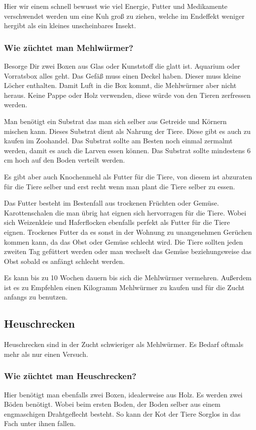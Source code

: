 Hier wir einem schnell bewusst wie viel Energie, Futter und Medikamente verschwendet werden um eine Kuh groß zu ziehen, welche im Endeffekt weniger hergibt als ein kleines unscheinbares Insekt.

\subsubsection{Wie züchtet man Mehlwürmer?}
Besorge Dir zwei Boxen aus Glas oder Kunststoff die glatt ist. Aquarium oder Vorratsbox alles geht. Das Gefäß muss einen Deckel haben. Dieser muss kleine Löcher enthalten. Damit Luft in die Box kommt, die Mehlwürmer aber nicht heraus. Keine Pappe oder Holz verwenden, diese würde von den Tieren zerfressen werden.

Man benötigt ein Substrat das man sich selber aus Getreide und Körnern mischen kann. Dieses Substrat dient als Nahrung der Tiere. Diese gibt es auch zu kaufen im Zoohandel. Das Substrat sollte am Besten noch einmal zermalmt werden, damit es auch die Larven essen können. Das Substrat sollte mindestens 6 cm hoch auf den Boden verteilt werden. 

Es gibt aber auch Knochenmehl als Futter für die Tiere, von diesem ist abzuraten für die Tiere selber und erst recht wenn man plant die Tiere selber zu essen. 
 
Das Futter besteht im Bestenfall aus trockenen Früchten oder Gemüse. Karottenschalen die man übrig hat eignen sich hervorragen für die Tiere. Wobei sich Weizenkleie und Haferflocken ebenfalls perfekt als Futter für die Tiere eignen. 
Trockenes Futter da es sonst in der Wohnung zu unangenehmen Gerüchen kommen kann, da das Obst oder Gemüse schlecht wird. 
Die Tiere sollten jeden zweiten Tag gefüttert werden oder man wechselt das Gemüse beziehungsweise das Obst sobald es anfängt schlecht werden.
 
Es kann bis zu 10 Wochen dauern bis sich die Mehlwürmer vermehren. Außerdem ist es zu Empfehlen einen Kilogramm Mehlwürmer zu kaufen und für die Zucht anfangs zu benutzen. 

\subsection{Heuschrecken}
Heuschrecken sind in der Zucht schwieriger als Mehlwürmer. Es Bedarf oftmals mehr als nur einen Versuch. 
\subsubsection{Wie züchtet man Heuschrecken?}
Hier benötigt man ebenfalls zwei Boxen, idealerweise aus Holz. Es werden zwei Böden benötigt. Wobei beim ersten Boden, der Boden selber aus einem engmaschigen Drahtgeflecht besteht. So kann der Kot der Tiere Sorglos in das Fach unter ihnen fallen.


